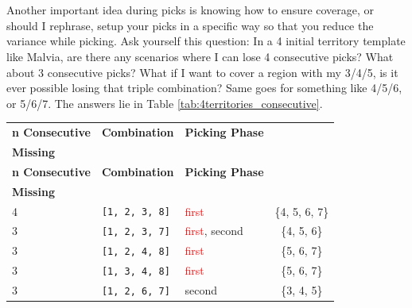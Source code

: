 \\
\\
Another important idea during picks is knowing how to ensure coverage, or should I rephrase, setup your picks in a specific way so that you reduce the variance while picking. Ask yourself this question: In a 4 initial territory template like Malvia, are there any scenarios where I can lose 4 consecutive picks? What about 3 consecutive picks? What if I want to cover a region with my 3/4/5, is it ever possible losing that triple combination? Same goes for something like 4/5/6, or 5/6/7. The answers lie in Table \ref{tab:4territories_consecutive}.

\small
\begin{longtable}{|p{2.5cm}|p{3cm}|p{2.5cm}|c|}
\hline
\rowcolor{black!20}
\textbf{n Consecutive} & \textbf{Combination} & \textbf{Picking Phase} & \makecell{\textbf{Consecutive} \\ \textbf{Missing}} \\ 
\hline
\endfirsthead

\hline
\rowcolor{black!20}
\textbf{n Consecutive} & \textbf{Combination} & \textbf{Picking Phase} & \makecell{\textbf{Consecutive} \\ \textbf{Missing}} \\ 
\hline
\endhead

4 & \texttt{[1, 2, 3, 8]} & \textcolor{red}{first} & \{4, 5, 6, 7\} \\ \hline

\hline\hline

3 & \texttt{[1, 2, 3, 7]} & \textcolor{red}{first}, \textcolor{CustomBlue}{second} & \{4, 5, 6\} \\ \hline
3 & \texttt{[1, 2, 4, 8]} & \textcolor{red}{first} & \{5, 6, 7\} \\ \hline
3 & \texttt{[1, 3, 4, 8]} & \textcolor{red}{first} & \{5, 6, 7\} \\ \hline
3 & \texttt{[1, 2, 6, 7]} & \textcolor{CustomBlue}{second} & \{3, 4, 5\} \\ \hline


\end{longtable}
